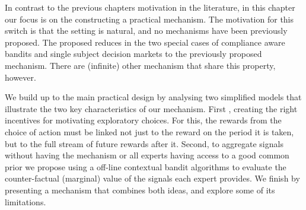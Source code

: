  


In contrast to the previous chapters motivation in the literature, in this chapter our focus is on the constructing a practical mechanism. 
The motivation for this switch is that the setting is natural, and no mechanisms have been previously proposed.
The proposed reduces in the two special cases of compliance aware bandits and single subject decision markets to the previously proposed mechanism.
There are (infinite) other mechanism that share this property, however. 

We build up to the main practical design by analysing two simplified models that illustrate the two key characteristics of our mechanism. 
First , creating the right incentives for motivating exploratory choices.
For this, the rewards from the choice of action must be linked not just to the reward on the period it is taken, but to the full stream of future rewards after it.
Second, to aggregate signals without having the mechanism or all  experts having access to a good common prior we propose using a off-line contextual bandit algorithms to evaluate the counter-factual (marginal) value of the signals each expert provides.
We finish by presenting a mechanism that combines both ideas, and explore some of its limitations.










